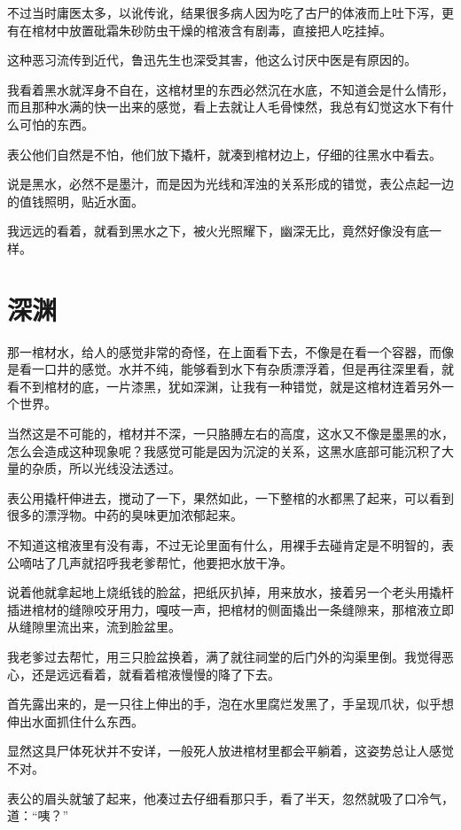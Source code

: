 不过当时庸医太多，以讹传讹，结果很多病人因为吃了古尸的体液而上吐下泻，更有在棺材中放置砒霜朱砂防虫干燥的棺液含有剧毒，直接把人吃挂掉。

这种恶习流传到近代，鲁迅先生也深受其害，他这么讨厌中医是有原因的。

我看着黑水就浑身不自在，这棺材里的东西必然沉在水底，不知道会是什么情形，而且那种水满的快一出来的感觉，看上去就让人毛骨悚然，我总有幻觉这水下有什么可怕的东西。

表公他们自然是不怕，他们放下撬杆，就凑到棺材边上，仔细的往黑水中看去。

说是黑水，必然不是墨汁，而是因为光线和浑浊的关系形成的错觉，表公点起一边的值钱照明，贴近水面。

我远远的看着，就看到黑水之下，被火光照耀下，幽深无比，竟然好像没有底一样。

\chapter{深渊}

那一棺材水，给人的感觉非常的奇怪，在上面看下去，不像是在看一个容器，而像是看一口井的感觉。水并不纯，能够看到水下有杂质漂浮着，但是再往深里看，就看不到棺材的底，一片漆黑，犹如深渊，让我有一种错觉，就是这棺材连着另外一个世界。

当然这是不可能的，棺材并不深，一只胳膊左右的高度，这水又不像是墨黑的水，怎么会造成这种现象呢？我感觉可能是因为沉淀的关系，这黑水底部可能沉积了大量的杂质，所以光线没法透过。

表公用撬杆伸进去，搅动了一下，果然如此，一下整棺的水都黑了起来，可以看到很多的漂浮物。中药的臭味更加浓郁起来。

不知道这棺液里有没有毒，不过无论里面有什么，用裸手去碰肯定是不明智的，表公嘀咕了几声就招呼我老爹帮忙，他要把水放干净。

说着他就拿起地上烧纸钱的脸盆，把纸灰扒掉，用来放水，接着另一个老头用撬杆插进棺材的缝隙咬牙用力，嘎吱一声，把棺材的侧面撬出一条缝隙来，那棺液立即从缝隙里流出来，流到脸盆里。

我老爹过去帮忙，用三只脸盆换着，满了就往祠堂的后门外的沟渠里倒。我觉得恶心，还是远远看着，就看着棺液慢慢的降了下去。

首先露出来的，是一只往上伸出的手，泡在水里腐烂发黑了，手呈现爪状，似乎想伸出水面抓住什么东西。

显然这具尸体死状并不安详，一般死人放进棺材里都会平躺着，这姿势总让人感觉不对。

表公的眉头就皱了起来，他凑过去仔细看那只手，看了半天，忽然就吸了口冷气，道：“咦？”

